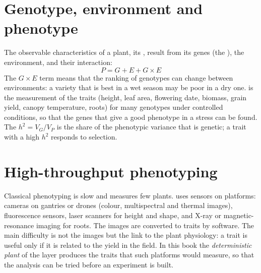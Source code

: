 \section{Genotype, environment and phenotype}
The observable characteristics of a plant, its , result from its genes (the ), the environment, and their interaction:
\begin{equation*}\boxed{P=G+E+G\times E}\end{equation*}
The $G\times E$ term means that the ranking of genotypes can change between environments: a variety that is best in a wet season may be poor in a dry one.  is the measurement of the traits (height, leaf area, flowering date, biomass, grain yield, canopy temperature, roots) for many genotypes under controlled conditions, so that the genes that give a good phenotype in a stress can be found. The  $h^2=V_G/V_P$ is the share of the phenotypic variance that is genetic; a trait with a high $h^2$ responds to selection.

\section{High-throughput phenotyping}
Classical phenotyping is slow and measures few plants.  uses sensors on platforms: cameras on gantries or drones (colour, multispectral and thermal images), fluorescence sensors, laser scanners for height and shape, and X-ray or magnetic-resonance imaging for roots. The images are converted to traits by software. The main difficulty is not the images but the link to the plant physiology: a trait is useful only if it is related to the yield in the field. In this book the \emph{deterministic plant} of the layer produces the traits that such platforms would measure, so that the analysis can be tried before an experiment is built.


